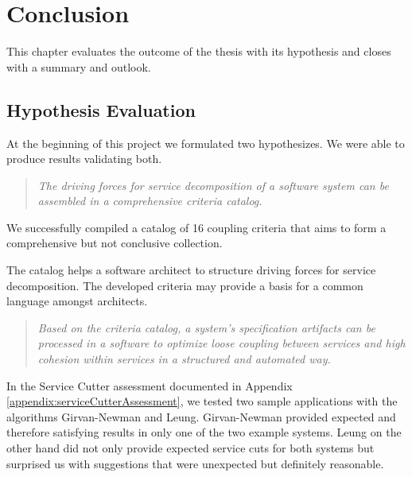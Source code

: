 \chapter{Conclusion}

This chapter evaluates the outcome of the thesis with its hypothesis and closes with a summary and outlook.

\section{Hypothesis Evaluation}

At the beginning of this project we formulated two hypothesizes. We were able to produce results validating both.

\begin{quote}
	\textit{The driving forces for service decomposition of a software system can be assembled in a comprehensive criteria catalog.}
\end{quote}

We successfully compiled a catalog of 16 coupling criteria that aims to form a comprehensive but not conclusive collection. 

The catalog helps a software architect to structure driving forces for service decomposition. The developed criteria may provide a basis for a common language amongst architects. 


\begin{quote}
	\textit{Based on the criteria catalog, a system's specification artifacts can be processed in a software to optimize loose coupling between services and high cohesion within services in a structured and automated way.}
\end{quote}

In the Service Cutter assessment documented in Appendix \ref{appendix:serviceCutterAssessment}, we tested two sample applications with the algorithms Girvan-Newman and Leung. Girvan-Newman provided expected and therefore satisfying results in only one of the two example systems. Leung on the other hand did not only provide expected service cuts for both systems but surprised us with suggestions that were unexpected but definitely reasonable.  

